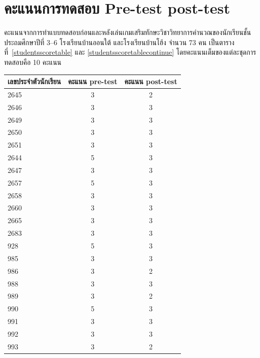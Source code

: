 \chapter{คะแนนการทดสอบ Pre-test post-test}
\label{kidsscore}
คะแนนจากการทำแบบทดสอบก่อนและหลังเล่นเกมเสริมทักษะวิชาวิทยาการคำนวณของนักเรียนชั้นประถมศึกษาปีที่ 3--6 โรงเรียนบ้านออนใต้ และโรงเรียนบ้านโฮ้ง จำนวน 73 คน เป็นตารางที่~\ref{studentsscoretable} และ \ref{studentsscoretablecontinue}
โดยคะแนนเต็มของแต่ละชุดการทดสอบคือ 10 คะแนน 
\begin{table}[h]
    \begin{center}
        \begin{tabular}{ |l|c|c| }
            \hline
            เลขประจำตัวนักเรียน & คะแนน pre-test & คะแนน post-test\\
            \hline\hline
            2645 & 3 & 2\\
            \hline
            2646 & 3 & 3\\
            \hline
            2649 & 3 & 3\\
            \hline
            2650 & 3 & 3\\
            \hline
            2651 & 3 & 3\\
            \hline
            2644 & 5 & 3\\
            \hline
            2647 & 3 & 3\\
            \hline
            2657 & 5 & 3\\
            \hline
            2658 & 3 &3\\
            \hline
            2660 & 3 & 3\\
            \hline
            2665 & 3 & 3\\
            \hline
            2683 & 3 & 3\\
            \hline
            928 & 5 & 3\\
            \hline
            985 & 3 & 3\\
            \hline
            986 & 3 & 2\\
            \hline
            988 & 3 & 3\\
            \hline
            989 & 3 & 2\\
            \hline
            990 & 5 & 3\\
            \hline
            991 & 3 & 3\\
            \hline
            992 & 3 & 3\\
            \hline
            993 & 3 & 2\\

\end{tabular}
\end{center}
\end{table}
